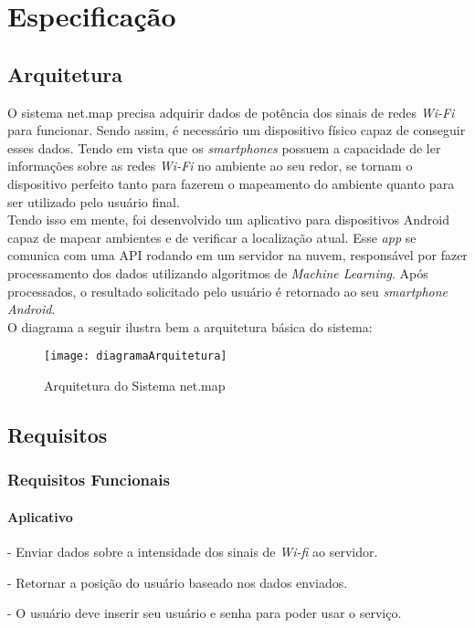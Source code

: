 
\chapter{Especificação}\label{chp:espec}

\section{Arquitetura}

O sistema net.map precisa adquirir dados de potência dos sinais de redes \textit{Wi-Fi} para funcionar. Sendo assim, é necessário um dispositivo físico capaz de conseguir esses dados. Tendo em vista que os \textit{smartphones} possuem a capacidade de ler informações sobre as redes \textit{Wi-Fi} no ambiente ao seu redor, se tornam o dispositivo perfeito tanto para fazerem o mapeamento do ambiente quanto para ser utilizado pelo usuário final.\\
Tendo isso em mente, foi desenvolvido um aplicativo para dispositivos Android capaz de mapear ambientes e de verificar a localização atual. Esse \textit{app} se comunica com uma API rodando em um servidor na nuvem, responsável por fazer processamento dos dados utilizando algoritmos de \textit{Machine Learning}. Após processados, o resultado solicitado pelo usuário é retornado ao seu \textit{smartphone Android}.\\
O diagrama a seguir ilustra bem a arquitetura básica do sistema:

\begin{figure}[H]
	\centering
	\caption{Arquitetura do Sistema net.map}
  \texttt{[image: diagramaArquitetura]}
\label{fig:diagramaArquitetura}
\end{figure}


\section{Requisitos}\label{sec:req}

\subsection{Requisitos Funcionais}

\subsubsection{Aplicativo}
- Enviar dados sobre a intensidade dos sinais de \textit{Wi-fi} ao servidor. \par
- Retornar a posição do usuário baseado nos dados enviados.\par
- O usuário deve inserir seu usuário e senha para poder usar o serviço.
